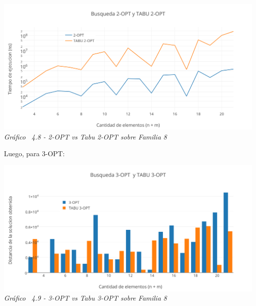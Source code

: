 \vspace*{0.3cm} \vspace*{0.3cm}
  \begin{center}
 \includegraphics[scale=0.5]{./EJ4/medicionrandom2opt.png}\\
 {            \textit{Gráfico \ 4.8 - 2-OPT vs Tabu 2-OPT sobre Familia 8}}
  \end{center}
  \vspace*{0.3cm}

Luego, para 3-OPT:

\vspace*{0.3cm} \vspace*{0.3cm}
  \begin{center}
 \includegraphics[scale=0.5]{./EJ4/comparativorandom3opt.png}\\
 {            \textit{Gráfico \ 4.9 - 3-OPT vs Tabu 3-OPT sobre Familia 8}}
  \end{center}
  \vspace*{0.3cm}

